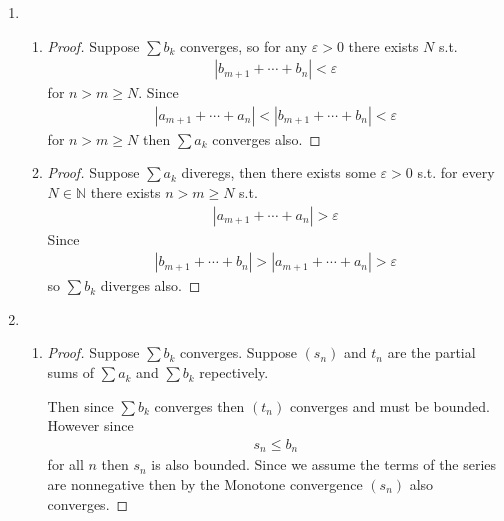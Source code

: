 \begin{enumerate}[label=(\alph*)]
    \item 
    \begin{enumerate}[label=(\roman*)]
        \item 
        \begin{proof}
            Suppose $\sum b_k$ converges, so for any $\varepsilon>0$
            there exists $N$ s.t. 
            \begin{align*}
                |b_{m+1}+\cdots + b_n| < \varepsilon
            \end{align*}
            for $n>m\geq N$. Since
            \begin{align*}
                |a_{m+1}+\cdots + a_n| < |b_{m+1}+\cdots + b_n| < \varepsilon
            \end{align*}
            for $n>m\geq N$ then $\sum a_k$ converges also.
        \end{proof}
        
        \item 
        \begin{proof}
            Suppose $\sum a_k$ diveregs, then there exists some
            $\varepsilon>0$ s.t. for every $N\in \mathbb{N}$
            there exists $n>m\geq N$ s.t. 
            \begin{align*}
                |a_{m+1}+\cdots + a_n| > \varepsilon
            \end{align*}
            Since 
            \begin{align*}
                |b_{m+1}+\cdots + b_n| > |a_{m+1}+\cdots + a_n| > \varepsilon
            \end{align*}
            so $\sum b_k$ diverges also.
        \end{proof}
    \end{enumerate}

    \item 
    \begin{enumerate}[label=(\roman*)]
        \item 
        \begin{proof}
            Suppose $\sum b_k$ converges. Suppose $(s_n)$ and
            $t_n$ are the partial sums of $\sum a_k$ and $\sum b_k$
            repectively.

            Then since $\sum b_k$ converges then $(t_n)$ converges and must 
            be bounded. However since 
            \begin{align*}
                s_n \leq b_n
            \end{align*}
            for all $n$ then $s_n$ is also bounded. Since we assume the 
            terms of the series are nonnegative then by the Monotone
            convergence \Thm $(s_n)$ also converges.
        \end{proof}


\end{enumerate}
\end{enumerate}
